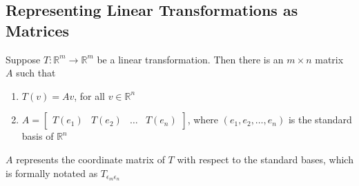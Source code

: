 \begin{enumerate}
\subsection{Representing Linear Transformations as Matrices}
Suppose $T : \mathbb{R}^m \rightarrow \mathbb{R}^m$ be a linear 
transformation. Then there is an $m \times n$ matrix $A$ such that 
\begin{enumerate}
  \item $T(v) = Av$, for all $v \in \mathbb{R}^n$ 
  \item $A = \begin{bmatrix} T(e_1) & T(e_2) & \dots & T(e_n) 
    \end{bmatrix}$, where $(e_1, e_2, \dots, e_n)$ is the 
    standard basis of $\mathbb{R}^n$
\end{enumerate} $A$ represents the coordinate matrix of $T$ with 
respect to the standard bases, which is formally notated as 
$T_{\epsilon_{m}\epsilon_{n}}$

\end{enumerate}
